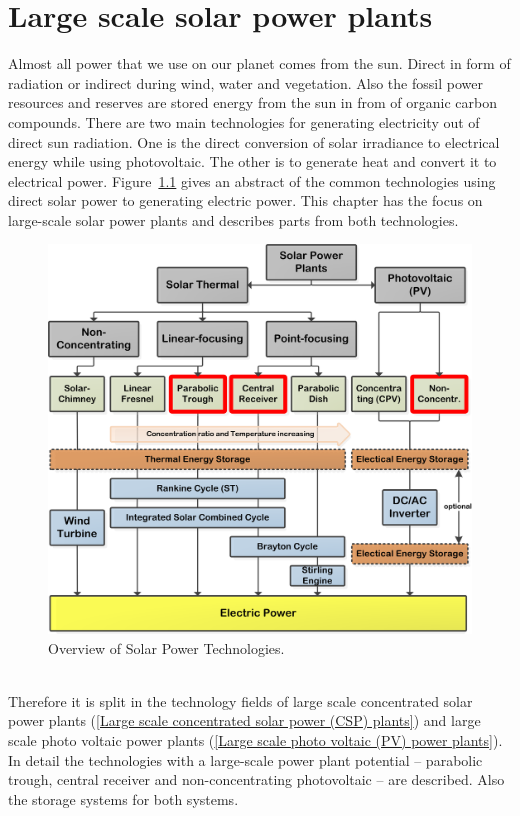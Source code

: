 \documentclass[Master,MEE,english]{twbook}%
\begin{document}
\chapter{Large scale solar power plants}
Almost all power that we use on our planet comes from the sun. Direct in form of radiation or indirect during wind, water and vegetation. Also the fossil power resources and reserves are stored energy from the sun in from of organic carbon compounds. There are two main technologies for generating electricity out of direct sun radiation. One is the direct conversion of solar irradiance to electrical energy while using photovoltaic. The other is to generate heat and convert it to electrical power. Figure~\ref{OverviewSTP} gives an abstract of the common technologies using direct solar power to generating electric power. This chapter has the focus on large-scale solar power plants and describes parts from both technologies.
\begin{figure}[!h] 
\centering
\includegraphics[width=0.75\linewidth]{FIG/OverviewSTP}
\caption[Overview of Solar Power Technologies.]{Overview of Solar Power Technologies.}\label{OverviewSTP}
\end{figure}
\\
Therefore it is split in the technology fields of large scale concentrated solar power plants (\ref{Large scale concentrated solar power (CSP) plants}) and large scale photo voltaic power plants (\ref{Large scale photo voltaic (PV) power plants}).
In detail the technologies with a large-scale power plant potential -- parabolic trough, central receiver and non-concentrating photovoltaic -- are described. Also the storage systems for both systems. 
\end{document}
